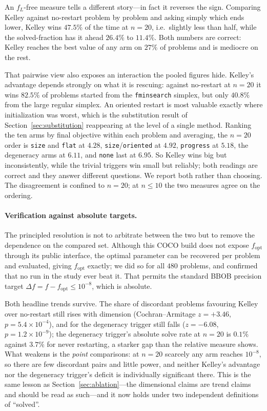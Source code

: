 \documentclass[11pt,a4paper]{article}
\begin{document}
An $f_L$-free measure tells a different story---in fact it reverses the
sign. Comparing Kelley against no-restart problem by problem and asking simply
which ends lower, Kelley wins $47.5\%$ of the time at $n=20$, i.e.\ slightly less
than half, while the solved-fraction has it ahead $26.4\%$ to $11.4\%$. Both
numbers are correct: Kelley reaches the best value of any arm on $27\%$ of
problems and is mediocre on the rest.

That pairwise view also exposes an interaction the pooled figures hide. Kelley's
advantage depends strongly on what it is rescuing: against no-restart at $n=20$
it wins $82.5\%$ of problems started from the \texttt{fminsearch} simplex, but
only $40.8\%$ from the large regular simplex. An oriented restart is most
valuable exactly where initialization was worst, which is the substitution
result of Section~\ref{sec:substitution} reappearing at the level of a single
method. Ranking the ten arms by final
objective within each problem and averaging, the $n=20$ order is \texttt{size}
and \texttt{flat} at $4.28$, \texttt{size}/\texttt{oriented} at $4.92$,
\texttt{progress} at $5.18$, the degeneracy arms at $6.11$, and \texttt{none}
last at $6.95$. So Kelley wins big but inconsistently, while the trivial triggers
win small but reliably; both readings are correct and they answer different
questions. We report both rather than choosing. The disagreement is confined to
$n=20$; at $n\le10$ the two measures agree on the ordering.

\paragraph{Verification against absolute targets.}
The principled resolution is not to arbitrate between the two but to remove the
dependence on the compared set. Although this COCO build does not expose
$f_{\mathrm{opt}}$ through its public interface, the optimal parameter can be
recovered per problem and evaluated, giving $f_{\mathrm{opt}}$ exactly; we did so
for all $480$ problems, and confirmed that no run in the study ever beat it. That
permits the standard BBOB precision target $\Delta f = f - f_{\mathrm{opt}} \le
10^{-8}$, which is absolute.

Both headline trends survive. The share of discordant problems favouring Kelley
over no-restart still rises with dimension (Cochran--Armitage $z=+3.46$,
$p=5.4\times10^{-4}$), and for the degeneracy trigger still falls ($z=-6.08$,
$p=1.2\times10^{-9}$); the degeneracy trigger's absolute solve rate at $n=20$ is
$0.1\%$ against $3.7\%$ for never restarting, a starker gap than the relative
measure shows. What weakens is the \emph{point} comparisons: at $n=20$ scarcely
any arm reaches $10^{-8}$, so there are few discordant pairs and little power,
and neither Kelley's advantage nor the degeneracy trigger's deficit is
individually significant there. This is the same lesson as
Section~\ref{sec:ablation}---the dimensional claims are trend claims and should
be read as such---and it now holds under two independent definitions of
``solved''.
\end{document}
